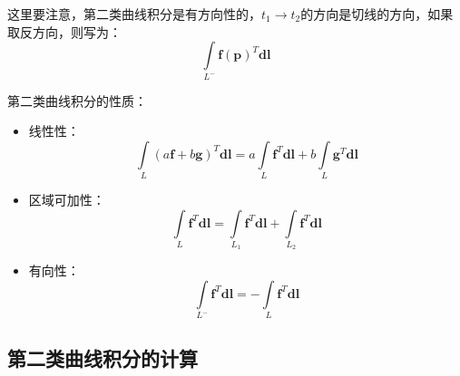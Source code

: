 这里要注意，第二类曲线积分是有方向性的，$t_1\rightarrow t_2$的方向是切线的方向，如果取反方向，则写为：
\[
\int\limits_{L^-}{\boldsymbol{f}\left( \boldsymbol{p} \right) ^T\boldsymbol{dl}}
\]

第二类曲线积分的性质：
\begin{itemize}
    \item 线性性：
    \[
    \int\limits_L{\left( a\boldsymbol{f}+b\boldsymbol{g} \right) ^T\boldsymbol{dl}}=a\int\limits_L{\boldsymbol{f}^T\boldsymbol{dl}}+b\int\limits_L{\boldsymbol{g}^T\boldsymbol{dl}}
    \]
    \item 区域可加性：
    \[
    \int\limits_L{\boldsymbol{f}^T\boldsymbol{dl}}=\int\limits_{L_1}{\boldsymbol{f}^T\boldsymbol{dl}}+\int\limits_{L_2}{\boldsymbol{f}^T\boldsymbol{dl}}
    \]
    \item 有向性：
    \[
    \int\limits_{L^-}{\boldsymbol{f}^T\boldsymbol{dl}}=-\int\limits_L{\boldsymbol{f}^T\boldsymbol{dl}}
    \]
\end{itemize}

\subsection{第二类曲线积分的计算}

